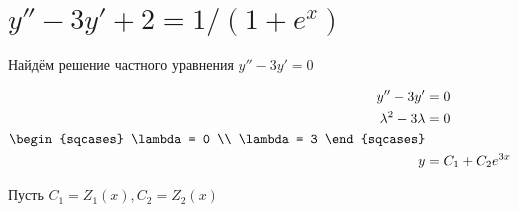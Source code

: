 

\cfoot{}



\section{$y''-3y'+2=1/(1+e^x)$}

Найдём решение частного уравнения $y'' - 3y' = 0$

\begin{align*}
    y'' - 3y'            & = 0                \\
    \lambda^2 - 3\lambda & = 0                \\
    \begin{sqcases}
        \lambda = 0 \\
        \lambda = 3
    \end{sqcases}                 \\
    y                    & = C_1 + C_2 e^{3x}
\end{align*}

Пусть \(C_1 = Z_1(x), C_2 = Z_2(x)\)


